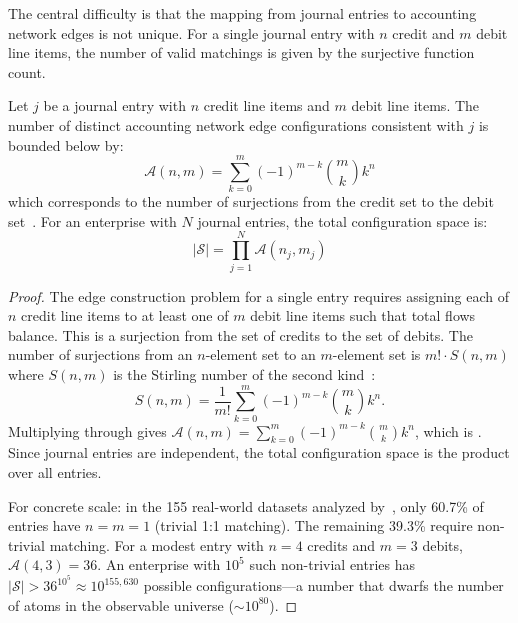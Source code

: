 The central difficulty is that the mapping from journal entries to
accounting network edges is not unique.  For a single journal entry
with $n$ credit and $m$ debit line items, the number of valid
matchings is given by the surjective function count.

\begin{proposition}
\label{thm:combinatorial}
Let $j$ be a journal entry with $n$ credit line items and $m$ debit
line items.  The number of distinct accounting network edge
configurations consistent with $j$ is bounded below by:
\begin{equation}
\mathcal{A}(n, m) = \sum_{k=0}^{m} (-1)^{m-k} \binom{m}{k} k^n
\label{eq:stirling_matching}
\end{equation}
which corresponds to the number of surjections from the credit set to
the debit set~\citep{ivertowski2024hardware}.  For an enterprise with
$N$ journal entries, the total configuration space is:
\begin{equation}
|\mathcal{S}| = \prod_{j=1}^{N} \mathcal{A}(n_j, m_j)
\label{eq:total_configs}
\end{equation}
\end{proposition}

\begin{proof}
The edge construction problem for a single entry requires assigning
each of $n$ credit line items to at least one of $m$ debit line items
such that total flows balance.  This is a surjection from the set of
credits to the set of debits.  The number of surjections from an
$n$-element set to an $m$-element set is $m! \cdot S(n,m)$ where
$S(n,m)$ is the Stirling number of the second
kind~\citep{ivertowski2024hardware}:
\[
S(n, m) = \frac{1}{m!} \sum_{k=0}^{m} (-1)^{m-k} \binom{m}{k} k^n.
\]
Multiplying through gives
$\mathcal{A}(n,m) = \sum_{k=0}^{m}(-1)^{m-k}\binom{m}{k}k^n$,
which is .
Since journal entries are independent, the total configuration space is
the product over all entries.

For concrete scale: in the 155 real-world datasets analyzed
by~\citet{ivertowski2024hardware}, only 60.7\% of entries have $n = m = 1$
(trivial 1:1 matching).  The remaining 39.3\% require non-trivial matching.
For a modest entry with $n = 4$ credits and $m = 3$ debits,
$\mathcal{A}(4,3) = 36$.  An enterprise with $10^5$ such non-trivial
entries has $|\mathcal{S}| > 36^{10^5} \approx 10^{155{,}630}$
possible configurations---a number that dwarfs the number of atoms in
the observable universe ($\sim 10^{80}$).
\end{proof}

